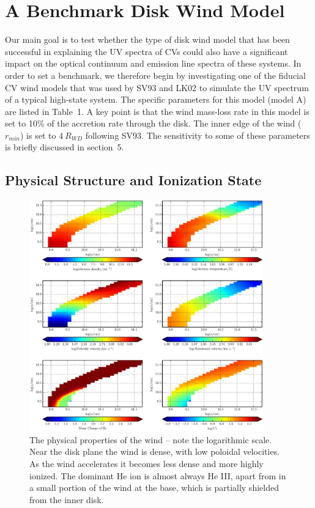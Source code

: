 \documentclass[preprint, a4paper, 11pt]{aastex}
\begin{document}
\nocite{walker1963}

\section{A Benchmark Disk Wind Model}
\label{modela}

Our main goal is to test whether the type of disk wind model that has
been successful in explaining the UV spectra of CVs could also have a
significant impact on the optical continuum and emission line spectra
of these systems. In order to set a benchmark, we therefore begin by
investigating one of the fiducial CV wind models that was used by SV93
and LK02 to simulate the UV spectrum of a typical high-state
system. The specific parameters for this model (model A) are listed in
Table~1. A key point is that the wind mass-loss rate in this model is
set to 10$\%$ of the accretion rate through the disk. The inner edge of
the wind ($r_{min}$) is set to $4~R_{WD}$ following SV93. 
The sensitivity to some of these parameters is briefly discussed in
section~5. 

\subsection{Physical Structure and Ionization State}
\label{modela_ionization}

\begin{figure} %
\includegraphics[width=0.9\textwidth]{figures/fig5.eps}
\caption{
The physical properties of the wind -- note the logarithmic scale. 
Near the disk plane the wind is dense, with low poloidal velocities.
As the wind accelerates it becomes less dense
and more highly ionized. The dominant He ion
is almost always He III, apart from in a small
portion of the wind at the base, which is partially shielded
from the inner disk.
}
\label{wind}
\end{figure} %
\end{document}
